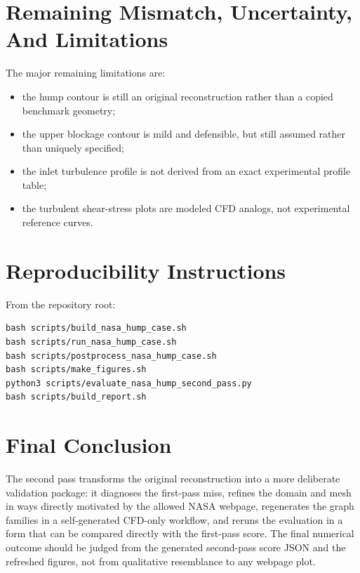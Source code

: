 \documentclass[11pt]{article}
\begin{document}
\section{Remaining Mismatch, Uncertainty, And Limitations}
The major remaining limitations are:
\begin{itemize}
\item the hump contour is still an original reconstruction rather than a copied benchmark geometry;
\item the upper blockage contour is mild and defensible, but still assumed rather than uniquely specified;
\item the inlet turbulence profile is not derived from an exact experimental profile table;
\item the turbulent shear-stress plots are modeled CFD analogs, not experimental reference curves.
\end{itemize}

\section{Reproducibility Instructions}
From the repository root:
\begin{lstlisting}
bash scripts/build_nasa_hump_case.sh
bash scripts/run_nasa_hump_case.sh
bash scripts/postprocess_nasa_hump_case.sh
bash scripts/make_figures.sh
python3 scripts/evaluate_nasa_hump_second_pass.py
bash scripts/build_report.sh
\end{lstlisting}

\section{Final Conclusion}
The second pass transforms the original reconstruction into a more deliberate validation package: it diagnoses the first-pass miss, refines the domain and mesh in ways directly motivated by the allowed NASA webpage, regenerates the graph families in a self-generated CFD-only workflow, and reruns the evaluation in a form that can be compared directly with the first-pass score. The final numerical outcome should be judged from the generated second-pass score JSON and the refreshed figures, not from qualitative resemblance to any webpage plot.



\end{document}
